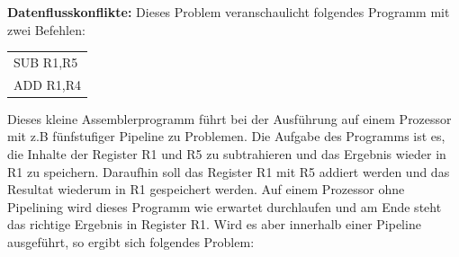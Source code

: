 \documentclass[a4paper,12pt]{article}
\begin{document}
\par\bigskip\noindent\textbf{Datenflusskonflikte:} Dieses Problem veranschaulicht folgendes Programm mit zwei Befehlen: 

\begin{table}[!htb]
\centering
\label{confliktProgramm}
\begin{tabular}{l}
SUB R1,R5 \\
ADD R1,R4
\end{tabular}
\end{table}

\noindent Dieses kleine Assemblerprogramm führt bei der Ausführung auf einem Prozessor mit z.B fünfstufiger Pipeline zu Problemen. Die Aufgabe des Programms ist es, die Inhalte der Register R1 und R5 zu subtrahieren und das Ergebnis wieder in R1 zu speichern. Daraufhin soll das Register R1 mit R5 addiert werden und das Resultat wiederum in R1 gespeichert werden. Auf einem Prozessor ohne Pipelining wird dieses Programm wie erwartet durchlaufen und am Ende steht das richtige Ergebnis in Register R1. Wird es aber innerhalb einer Pipeline ausgeführt, so ergibt sich folgendes Problem:
\end{document}
